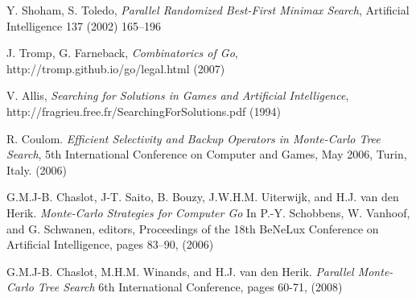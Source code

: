 \documentclass[conference]{IEEEtran}
\begin{document}

\begin{thebibliography}{1}

Y. Shoham, S. Toledo, \emph{Parallel Randomized Best-First Minimax Search},  Artificial Intelligence 137 (2002) 165--196

J. Tromp, G. Farneback, \emph{Combinatorics of Go},
http://tromp.github.io/go/legal.html (2007)

V. Allis, \emph{Searching for Solutions in Games and Artificial Intelligence},
http://fragrieu.free.fr/SearchingForSolutions.pdf (1994)

R. Coulom.  \emph{Efficient Selectivity and Backup Operators in Monte-Carlo Tree Search}, 5th International Conference on Computer and Games, May 2006, Turin, Italy. (2006)

G.M.J-B. Chaslot, J-T. Saito, B. Bouzy, J.W.H.M. Uiterwijk, and H.J. van den
Herik. \emph{Monte-Carlo Strategies for Computer Go} In P.-Y. Schobbens, W. Vanhoof,
and G. Schwanen, editors, Proceedings of the 18th BeNeLux Conference on
Artificial Intelligence, pages 83–90, (2006)

G.M.J-B. Chaslot, M.H.M. Winands, and H.J. van den Herik. \emph{Parallel Monte-Carlo Tree Search} 6th International Conference, pages 60-71, (2008)

\end{thebibliography}
\end{document}
